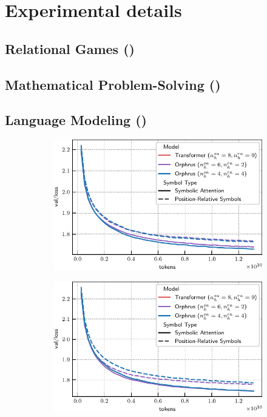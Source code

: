\section{Experimental details}\label{sec:appendix_experimental_details}

\subsection{Relational Games ()}\label{ssec:appendxi_relgames}

\subsection{Mathematical Problem-Solving ()}\label{ssec:appendix_math}

\subsection{Language Modeling ()}\label{ssec:appendix_lm}

\begin{figure}
    \begin{subfigure}{0.45\textwidth}
        \includegraphics{figs/experiments/tiny_stories/d64L4_ablation_symboltype_asymra.pdf}
    \end{subfigure}
    \begin{subfigure}{0.45\textwidth}
        \includegraphics{figs/experiments/tiny_stories/d64L4_ablation_symboltype_symra.pdf}
    \end{subfigure}
\end{figure}

